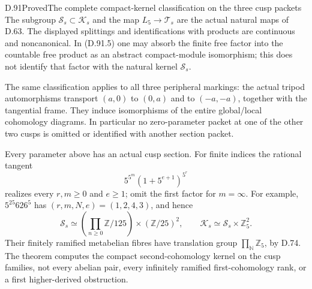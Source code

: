 \begin{statement}{D.91}{Proved}{The complete compact-kernel classification on the three cusp packets}
The subgroup \(\mathcal S_s\subset\mathcal K_s\) and
the map \(L_5\to\mathcal T_s\) are the actual natural
maps of D.63. The displayed splittings and identifications
with products are continuous and noncanonical. In (D.91.5)
one may absorb the finite free factor into the countable
free product as an abstract compact-module isomorphism;
this does not identify that factor with the natural kernel
\(\mathcal S_s\).

The same classification applies to all three peripheral
markings: the actual tripod automorphisms transport
\((a,0)\) to \((0,a)\) and to \((-a,-a)\), together
with the tangential frame. They induce isomorphisms of the
entire global/local cohomology diagrams. In particular no
zero-parameter packet at one of the other two cusps is
omitted or identified with another section packet.

Every parameter above has an actual cusp section. For finite
indices the rational tangent
\[
                5^{5^m}(1+5^{e+1})^{5^r}
                                                               \tag{D.91.6}
\]
realizes every \(r,m\ge0\) and \(e\ge1\); omit the first
factor for \(m=\infty\). For example, \(5^{25}626^5\)
has \((r,m,N,e)=(1,2,4,3)\), and hence
\[
 \mathcal S_s\simeq
 \left(\prod_{n\ge0}\mathbb Z/125\right)\times(\mathbb Z/25)^2,
 \qquad \mathcal K_s\simeq\mathcal S_s\times\mathbb Z_5^2.
                                                               \tag{D.91.7}
\]
Their finitely ramified metabelian fibres have translation
group \(\prod_{\mathbb N}\mathbb Z_5\), by D.74.
The theorem computes the compact second-cohomology kernel
on the cusp families, not every abelian pair, every
infinitely ramified first-cohomology rank, or a first
higher-derived obstruction.
\end{statement}

